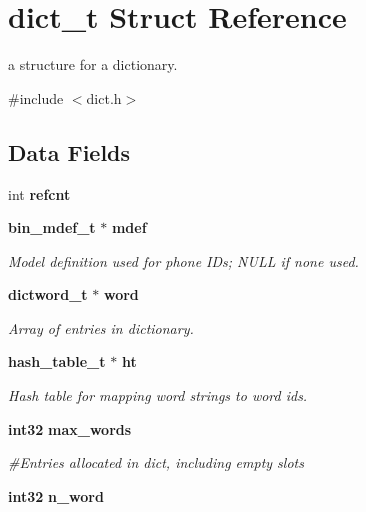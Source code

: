 \section{dict\-\_\-t \-Struct \-Reference}
\label{structdict__t}


a structure for a dictionary.  




{\ttfamily \#include $<$dict.\-h$>$}

\subsection*{\-Data \-Fields}
\begin{DoxyCompactItemize}
\item 
int {\bfseries refcnt}\label{structdict__t_a5fab69be1205a6c84ec93a4b08924d3c}

\item 
{\bf bin\-\_\-mdef\-\_\-t} $\ast$ {\bf mdef}\label{structdict__t_a3a01eb5a3ebda5652d434be26e0cfdd2}

\begin{DoxyCompactList}\small\item\em \-Model definition used for phone \-I\-Ds; \-N\-U\-L\-L if none used. \end{DoxyCompactList}\item 
{\bf dictword\-\_\-t} $\ast$ {\bf word}\label{structdict__t_a9e6636bbe45936a03381fea430addd31}

\begin{DoxyCompactList}\small\item\em \-Array of entries in dictionary. \end{DoxyCompactList}\item 
{\bf hash\-\_\-table\-\_\-t} $\ast$ {\bf ht}\label{structdict__t_a7205aae4fbeef3aaa53f94b6af529af2}

\begin{DoxyCompactList}\small\item\em \-Hash table for mapping word strings to word ids. \end{DoxyCompactList}\item 
{\bf int32} {\bf max\-\_\-words}\label{structdict__t_af6142600cef73f846b58ba9bc36b02ac}

\begin{DoxyCompactList}\small\item\em \#\-Entries allocated in dict, including empty slots \end{DoxyCompactList}\item 
{\bf int32} {\bf n\-\_\-word}\label{structdict__t_af00f60319a7025361e291af5addb6b31}


\end{DoxyCompactItemize}
